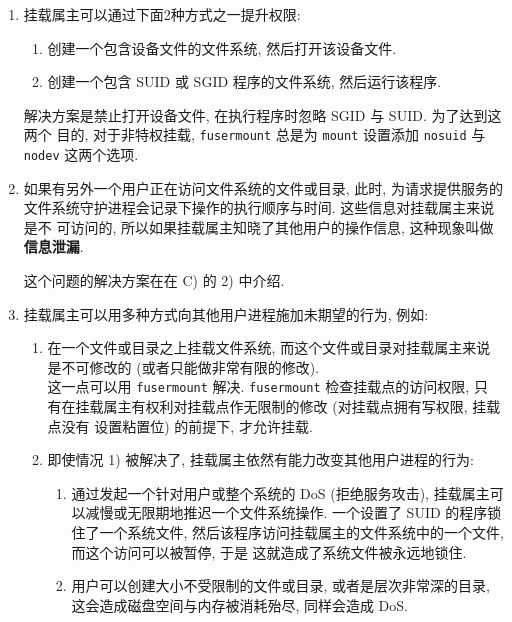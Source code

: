 \documentclass[nofonts, titlepage]{ctexart}
\begin{document}
\def\labelenumi{\Alph{enumi})}
\def\labelenumii{\arabic{enumii})}
\def\labelenumiii{\roman{enumiii})}
\begin{enumerate}
    \item
        挂载属主可以通过下面2种方式之一提升权限:
        \begin{enumerate}
            \item
                创建一个包含设备文件的文件系统, 然后打开该设备文件.\\
            \item
                创建一个包含 SUID 或 SGID 程序的文件系统, 然后运行该程序.
        \end{enumerate}

        解决方案是禁止打开设备文件, 在执行程序时忽略 SGID 与 SUID.
        为了达到这两个 目的, 对于非特权挂载, \texttt{fusermount} 总是为
        \texttt{mount} 设置添加 \texttt{nosuid} 与 \texttt{nodev} 这两个选项.

    \item
        如果有另外一个用户正在访问文件系统的文件或目录, 此时,
        为请求提供服务的 文件系统守护进程会记录下操作的执行顺序与时间.
        这些信息对挂载属主来说是不 可访问的,
        所以如果挂载属主知晓了其他用户的操作信息, 这种现象叫做
        \textbf{信息泄漏}.

        这个问题的解决方案在在 C) 的 2) 中介绍.

    \item
        挂载属主可以用多种方式向其他用户进程施加未期望的行为, 例如:
        \begin{enumerate}
            \item
                在一个文件或目录之上挂载文件系统, 而这个文件或目录对挂载属主来说
                是不可修改的 (或者只能做非常有限的修改).\\这一点可以用
                \texttt{fusermount} 解决. \texttt{fusermount} 检查挂载点的访问权限,
                只 有在挂载属主有权利对挂载点作无限制的修改 (对挂载点拥有写权限,
                挂载点没有 设置粘置位) 的前提下, 才允许挂载.
            \item
                即使情况 1) 被解决了, 挂载属主依然有能力改变其他用户进程的行为:
                \begin{enumerate}
                    \item
                        通过发起一个针对用户或整个系统的 DoS (拒绝服务攻击),
                        挂载属主可以减慢或无限期地推迟一个文件系统操作. 一个设置了 SUID
                        的程序锁住了一个系统文件,
                        然后该程序访问挂载属主的文件系统中的一个文件,
                        而这个访问可以被暂停, 于是 这就造成了系统文件被永远地锁住.
                    \item
                        用户可以创建大小不受限制的文件或目录, 或者是层次非常深的目录,
                        这会造成磁盘空间与内存被消耗殆尽, 同样会造成 DoS.
                \end{enumerate}
        \end{enumerate}
\end{enumerate}
\end{document}
